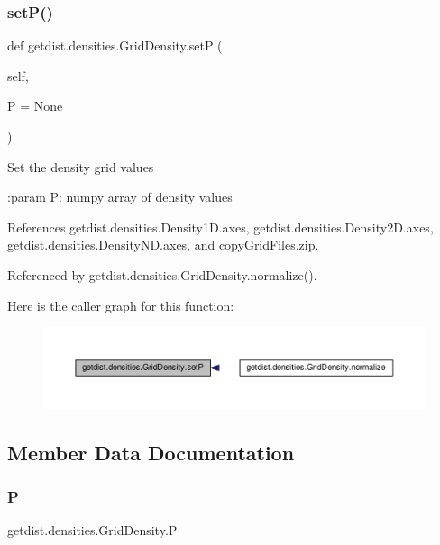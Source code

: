 \subsubsection{\texorpdfstring{set\+P()}{setP()}}
{\footnotesize\ttfamily def getdist.\+densities.\+Grid\+Density.\+setP (\begin{DoxyParamCaption}\item[{}]{self,  }\item[{}]{P = {\ttfamily None} }\end{DoxyParamCaption})}

\begin{DoxyVerb}Set the density grid values

:param P: numpy array of density values
\end{DoxyVerb}
 

References getdist.\+densities.\+Density1\+D.\+axes, getdist.\+densities.\+Density2\+D.\+axes, getdist.\+densities.\+Density\+N\+D.\+axes, and copy\+Grid\+Files.\+zip.



Referenced by getdist.\+densities.\+Grid\+Density.\+normalize().

Here is the caller graph for this function\+:
\nopagebreak
\begin{figure}[H]
\begin{center}
\leavevmode
\includegraphics[width=350pt]{classgetdist_1_1densities_1_1GridDensity_a846e4c6346b0b839fbec49eab7570b3e_icgraph}
\end{center}
\end{figure}


\subsection{Member Data Documentation}
\mbox{\label{classgetdist_1_1densities_1_1GridDensity_aad3d52edbfbf1a94ecbd0c779bd39dc2}} 
\subsubsection{\texorpdfstring{P}{P}}
{\footnotesize\ttfamily getdist.\+densities.\+Grid\+Density.\+P}



